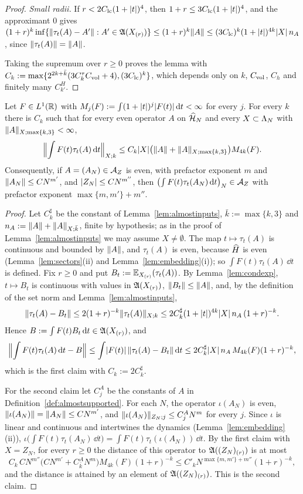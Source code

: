 \begin{proof}
\emph{Small radii.} If $r<2C_{\rm lc}(1+\lvert t\rvert)^4$, then $1+r\le3C_{\rm lc}(1+\lvert t\rvert)^4$, and the approximant $0$ gives
$(1+r)^k\inf\{\lVert\tau_t(A)-A'\rVert:A'\in\mathfrak{A}(X_{(r)})\}\le(1+r)^k\lVert A\rVert\le(3C_{\rm lc})^k(1+\lvert t\rvert)^{4k}\lvert X\rvert\,n_A$, since
$\lVert\tau_t(A)\rVert=\lVert A\rVert$.

Taking the supremum over $r\ge0$ proves the lemma with $C_k:=\max\{2^{2k+\bar k}(3C^\tau_kC_{\mathrm{vol}}+4),(3C_{\rm lc})^k\}$, which depends
only on $k$, $C_{\mathrm{vol}}$, $C_h$ and finitely many $C^H_{k'}$.
\end{proof}

\begin{lemma}\label{lem:filters}
Let $F\in L^1(\mathbb{R})$ with $M_j(F):=\int(1+\lvert t\rvert)^j\lvert F(t)\rvert\,\mathrm{d} t<\infty$ for every $j$. For every $k$ there is
$C_k$ such that for every even operator $A$ on $\widehat{\mathcal{H}}_N$ and every $X\subset\Lambda_N$ with $\lVert A\rVert_{X;\max\{k,3\}}<\infty$,
\[
\Bigl\lVert\int F(t)\tau_t(A)\,\mathrm{d} t\Bigr\rVert_{X;k}\le C_k\lvert X\rvert\bigl(\lVert A\rVert+\lVert A\rVert_{X;\max\{k,3\}}\bigr)M_{4k}(F).
\]
Consequently, if $A=(A_N)\in\mathcal{A}_Z$ is even, with prefactor exponent $m$ and $\lVert A_N\rVert\le CN^{m'}$, and
$\lvert Z_N\rvert\le CN^{m''}$, then $\bigl(\int F(t)\tau_t(A_N)\,\mathrm{d} t\bigr)_N\in\mathcal{A}_Z$ with prefactor exponent
$\max\{m,m'\}+m''$.
\end{lemma}

\begin{proof}
Let $C^\sharp_k$ be the constant of Lemma~\ref{lem:almostinputs}, $\bar k:=\max\{k,3\}$ and
$n_A:=\lVert A\rVert+\lVert A\rVert_{X;\bar k}$, finite by hypothesis; as in the proof of Lemma~\ref{lem:almostinputs} we may assume
$X\ne\emptyset$. The map $t\mapsto\tau_t(A)$ is continuous and bounded by $\lVert A\rVert$, and $\tau_t(A)$ is even, because
$\widehat{H}$ is even (Lemma~\ref{lem:sectors}(ii) and Lemma~\ref{lem:embedding}(i)); so $\int F(t)\tau_t(A)\,\dd t$ is
defined. Fix $r\ge0$ and put $B_t:=\mathbb{E}_{X_{(r)}}(\tau_t(A))$. By Lemma~\ref{lem:condexp}, $t\mapsto B_t$ is continuous
with values in $\mathfrak{A}(X_{(r)})$, $\lVert B_t\rVert\le\lVert A\rVert$, and, by the definition of the set norm and
Lemma~\ref{lem:almostinputs},
\[
\lVert\tau_t(A)-B_t\rVert\le2(1+r)^{-k}\lVert\tau_t(A)\rVert_{X;k}\le2C^\sharp_k(1+\lvert t\rvert)^{4k}\lvert X\rvert\,n_A\,(1+r)^{-k}.
\]
Hence $B:=\int F(t)B_t\,\mathrm{d} t\in\mathfrak{A}(X_{(r)})$, and
\[
\Bigl\lVert\int F(t)\tau_t(A)\,\mathrm{d} t-B\Bigr\rVert\le\int\lvert F(t)\rvert\,\lVert\tau_t(A)-B_t\rVert\,\mathrm{d} t\le2C^\sharp_k\lvert X\rvert\,n_A\,M_{4k}(F)(1+r)^{-k},
\]
which is the first claim with $C_k:=2C^\sharp_k$.

For the second claim let $C^A_j$ be the constants of $A$ in Definition~\ref{def:almostsupported}. For each $N$, the
operator $\iota(A_N)$ is even, $\lVert\iota(A_N)\rVert=\lVert A_N\rVert\le CN^{m'}$, and $\lVert\iota(A_N)\rVert_{Z_N;j}\le C^A_jN^m$ for
every $j$. Since $\iota$ is linear and continuous and intertwines the dynamics (Lemma~\ref{lem:embedding}(ii)),
$\iota\bigl(\int F(t)\tau_t(A_N)\,\dd t\bigr)=\int F(t)\tau_t(\iota(A_N))\,\dd t$. By the first claim with $X=Z_N$, for every
$r\ge0$ the distance of this operator to $\mathfrak{A}((Z_N)_{(r)})$ is at most
\[
C_k\,CN^{m''}\bigl(CN^{m'}+C^A_{\bar k}N^m\bigr)M_{4k}(F)(1+r)^{-k}\le C'_kN^{\max\{m,m'\}+m''}(1+r)^{-k},
\]
and the distance is attained by an element of $\mathfrak{A}((Z_N)_{(r)})$. This is the second claim.
\end{proof}

